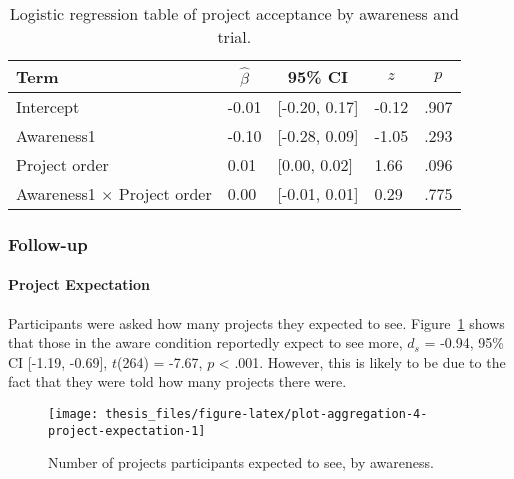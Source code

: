 \documentclass[a4paper, nobind]{templates/ociamthesis}
\theoremstyle{definition}
\theoremstyle{definition}
\theoremstyle{definition}
\theoremstyle{definition}
\theoremstyle{remark}
\begin{document}
\begin{table}[tbp]

\begin{center}
\begin{threeparttable}

\caption{\label{tab:awareness-project-order}Logistic regression table of project acceptance by awareness and trial.}

\begin{tabular}{lllll}
\toprule
Term & \multicolumn{1}{c}{$\hat{\beta}$} & \multicolumn{1}{c}{95\% CI} & \multicolumn{1}{c}{$z$} & \multicolumn{1}{c}{$p$}\\
\midrule
Intercept & -0.01 & {}[-0.20, 0.17] & -0.12 & .907\\
Awareness1 & -0.10 & {}[-0.28, 0.09] & -1.05 & .293\\
Project order & 0.01 & {}[0.00, 0.02] & 1.66 & .096\\
Awareness1 $\times$ Project order & 0.00 & {}[-0.01, 0.01] & 0.29 & .775\\
\bottomrule
\end{tabular}

\end{threeparttable}
\end{center}

\end{table}

\subsubsection{Follow-up}

\paragraph{Project Expectation}

Participants were asked how many projects they expected to see.
Figure~\ref{fig:plot-aggregation-4-project-expectation} shows that those in the
aware condition reportedly expect to see more,
\(d_s\) = -0.94, 95\% CI {[}-1.19, -0.69{]}, \(t\)(264) = -7.67, \(p\) \textless{} .001. However, this is likely to be due to
the fact that they were told how many projects there were.



\begin{figure}
\texttt{[image: thesis\_files/figure-latex/plot-aggregation-4-project-expectation-1]} \caption{Number of projects participants expected to see, by awareness.}\label{fig:plot-aggregation-4-project-expectation}
\end{figure}
\end{document}
